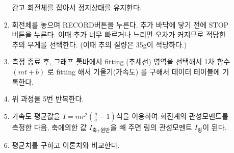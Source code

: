 \documentclass[12pt,a4paper]{article}
\begin{document}
\begin{enumerate}
\begin{enumerate}
\begin{enumerate}
                        감고 회전체를 잡아서 정지상태를 유지한다.
                    \item 회전체를 놓으며 RECORD버튼을 누른다. 추가 바닥에 닿기
                        전에 STOP 버튼을 누른다. 이때 추가 너무 빠르거나 느리면
                        오차가 커지므로 적당한 추의 무게를 선택한다.
                        (이때 추의 질량은 35g이 적당하다.)
                    \item 측정 종료 후, 그래프 툴바에서 fitting (추세선) 영역을
                        선택해서 1차 함수 $(mt+b)$ 로 fitting 해서 기울기(가속도)
                        를 구해서 데이터 테이블에 기록한다.
                    \item 위 과정을 5번 반복한다.
                    \item 가속도 평균값을 $I = mr^2(\frac{g}{a}-1)$식을 이용하여
                        회전계의 관성모멘트를 측정한 다음, 축에의한 값
                        $I_{\textrm{축+원반}}$을 빼 주면 링의 관성모멘트
                        $I_{\textrm{링}}$이 된다.
                    \item 평균치를 구하고 이론치와 비교한다.
                \end{enumerate}
        \end{enumerate}
\end{enumerate}
\end{document}
